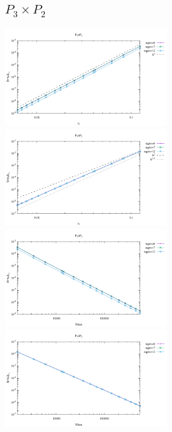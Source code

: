 \subsection*{$P_3\times P_2$}
\begin{center}
\includegraphics[width=7cm]{python_codes/fieldstone_120/results/P3P2-velocity-h.pdf}
\includegraphics[width=7cm]{python_codes/fieldstone_120/results/P3P2-pressure-h.pdf}
\includegraphics[width=7cm]{python_codes/fieldstone_120/results/P3P2-velocity-Nfem.pdf}
\includegraphics[width=7cm]{python_codes/fieldstone_120/results/P3P2-pressure-Nfem.pdf}
\end{center}

